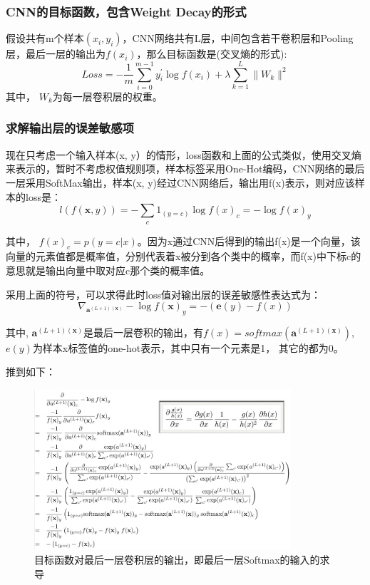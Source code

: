 \subsubsection{CNN的目标函数，包含Weight Decay的形式}

假设共有m个样本$(x_i, y_i)$，CNN网络共有L层，中间包含若干卷积层和Pooling层，最后一层的输出为$f(x_i)$，那么目标函数是(交叉熵的形式):
\begin{displaymath}
Loss = -\frac{1}{m}\sum_{i=0}^{m-1}y_i^{'}\log f(x_i) + \lambda \sum_{k=1}^{L}\parallel W_k \parallel^2
\end{displaymath}
其中， $W_k$为每一层卷积层的权重。

\subsubsection{求解输出层的误差敏感项}

现在只考虑一个输入样本(x, y）的情形，loss函数和上面的公式类似，使用交叉熵来表示的，暂时不考虑权值规则项，样本标签采用One-Hot编码，CNN网络的最后一层采用SoftMax输出，样本(x, y)经过CNN网络后，输出用f(x)表示，则对应该样本的loss是：
\begin{displaymath}
l(f(\mathbf{x}, y)) = -\sum_{c}1_{(y=c)} \log f(x)_c = -\log f(x)_y
\end{displaymath}

其中， $f(x)_c = p(y = c|x)$。因为x通过CNN后得到的输出f(x)是一个向量，该向量的元素值都是概率值，分别代表着x被分到各个类中的概率，而f(x)中下标c的意思就是输出向量中取对应c那个类的概率值。

采用上面的符号，可以求得此时loss值对输出层的误差敏感性表达式为：
\begin{displaymath}
\nabla_{\mathbf{a}^{(L+1)(\mathbf{x})}} - \log f(\mathbf{x})_y = -(\mathbf{e}(y) - f(x))
\end{displaymath}

其中, $\mathbf{a}^{(L+1)(\mathbf{x})}$是最后一层卷积的输出，有$f(x) = softmax(\mathbf{a}^{(L+1)(\mathbf{x})})$, $e(y)$为样本x标签值的one-hot表示，其中只有一个元素是1， 其它的都为0。


推到如下：
\begin{figure}[!hbtp]
\centering
\includegraphics[width=0.85\textwidth]{DLTips/BP1.jpg}
\caption{目标函数对最后一层卷积层的输出，即最后一层Softmax的输入的求导}
\label{BP1}
\end{figure}

